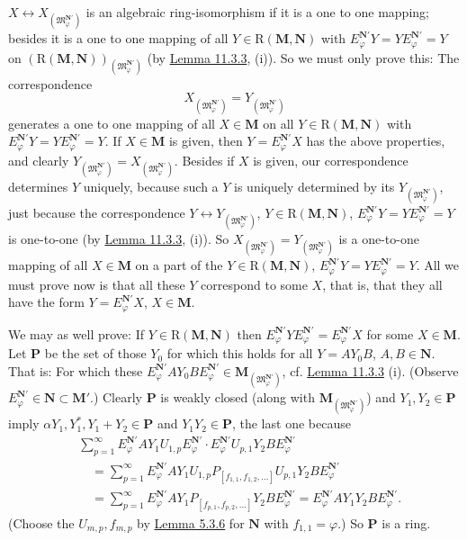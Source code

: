 \documentclass[12pt,b5paper,twoside]{article}
\newcommand{\M}{\mathbf M}
\newcommand{\N}{\mathbf N}
\renewcommand{\P}{\mathbf P}
\newcommand{\lemref}[1]{\hyperref[lem:#1]{Lemma #1}}
\begin{document}
$X\longleftrightarrow X_{(\mathfrak M_{\varphi}^{\N'})}$ is an algebraic
ring-isomorphism if it is a one to one mapping; besides it is a one to one
mapping of all $Y\in\mathrm R(\M,\N)$ with
$E_{\varphi}^{\N'}Y=YE_{\varphi}^{\N'}=Y$ on
$(\mathrm R(\M,\N))_{(\mathfrak M_{\varphi}^{\N'})}$ (by
\lemref{11.3.3}, (i)). So we must only prove this: The correspondence
\[
 X_{(\mathfrak M_{\varphi}^{\N'})}
 =Y_{(\mathfrak M_{\varphi}^{\N'})}
\]
generates a one to one mapping of all $X\in\M$ on all
$Y\in\mathrm R(\M,\N)$ with
$E_{\varphi}^{\N'}Y=YE_{\varphi}^{\N'}=Y$. If $X\in\M$ is given, then
$Y=E_{\varphi}^{\N'}X$ has the above properties, and clearly
$Y_{(\mathfrak M_{\varphi}^{\N'})}
=X_{(\mathfrak M_{\varphi}^{\N'})}$. Besides if $X$ is given, our
correspondence determines $Y$ uniquely, because such a $Y$ is uniquely
determined by its $Y_{(\mathfrak M_{\varphi}^{\N'})}$, just because the
correspondence
$Y\longleftrightarrow Y_{(\mathfrak M_{\varphi}^{\N'})}$,
$Y\in\mathrm R(\M,\N)$,
$E_{\varphi}^{\N'}Y=YE_{\varphi}^{\N'}=Y$ is one-to-one (by
\lemref{11.3.3}, (i)). So
$X_{(\mathfrak M_{\varphi}^{\N'})}
=Y_{(\mathfrak M_{\varphi}^{\N'})}$ is a one-to-one mapping of all
$X\in\M$ on a part of the $Y\in\mathrm R(\M,\N)$,
$E_{\varphi}^{\N'}Y=YE_{\varphi}^{\N'}=Y$. All we must prove now is that
all these $Y$ correspond to some $X$, that is, that they all have the form
$Y=E_{\varphi}^{\N'}X$, $X\in\M$.

We may as well prove: If $Y\in\mathrm R(\M,\N)$ then
$E_{\varphi}^{\N'}YE_{\varphi}^{\N'}=E_{\varphi}^{\N'}X$ for some
$X\in\M$. Let $\P$ be the set of those $Y_0$ for which this holds for all
$Y=AY_0B$, $A,B\in\N$. That is: For which these
$E_{\varphi}^{\N'}AY_0BE_{\varphi}^{\N'}
\in\M_{(\mathfrak M_{\varphi}^{\N'})}$, cf. \lemref{11.3.3} (i).
(Observe $E_{\varphi}^{\N'}\in\N\subset\M'$.) Clearly $\P$ is weakly
closed (along with $\M_{(\mathfrak M_{\varphi}^{\N'})}$) and
$Y_1,Y_2\in\P$ imply $\alpha Y_1,Y_1^*,Y_1+Y_2\in\P$ and
$Y_1Y_2\in\P$, the last one because
\begin{align*}
 &\sum_{p=1}^{\infty}E_{\varphi}^{\N'}AY_1U_{1,p}E_{\varphi}^{\N'}
 \cdot E_{\varphi}^{\N'}U_{p,1}Y_2BE_{\varphi}^{\N'}\\
 &\quad=\sum_{p=1}^{\infty}E_{\varphi}^{\N'}AY_1U_{1,p}
 P_{[f_{1,1},f_{1,2},\ldots]}U_{p,1}Y_2BE_{\varphi}^{\N'}\\
 &\quad=\sum_{p=1}^{\infty}E_{\varphi}^{\N'}AY_1
 P_{[f_{p,1},f_{p,2},\ldots]}Y_2BE_{\varphi}^{\N'}
 =E_{\varphi}^{\N'}AY_1Y_2BE_{\varphi}^{\N'}.
\end{align*}
(Choose the $U_{m,p},f_{m,p}$ by \lemref{5.3.6} for $\N$ with
$f_{1,1}=\varphi$.) So $\P$ is a ring.
\end{document}
